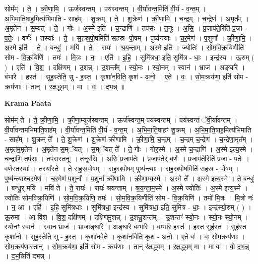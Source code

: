 \documentclass[17pt]{extarticle}
\begin{document}
सोम᳚म् । ते॒ । क्री॒णा॒मि॒ । ऊर्ज॑स्वन्तम् । पय॑स्वन्तम् । वी॒र्या॑वन्त॒मिति॑ वी॒र्य॑ - व॒न्त॒म् । अ॒भि॒मा॒ति॒षाह॒मित्य॑भिमाति - साह᳚म् । शु॒क्रम् । ते॒ । शु॒क्रेण॑ । क्री॒णा॒मि॒ । च॒न्द्रम् । च॒न्द्रेण॑ । अ॒मृत᳚म् । अ॒मृते॑न । स॒म्यत् । ते॒ । गोः । अ॒स्मे इति॑ । च॒न्द्राणि॑ । तप॑सः । त॒नूः । अ॒सि॒ । प्र॒जाप॑ते॒रिति॑ प्र॒जा - प॒तेः॒ । वर्णः॑ । तस्याः᳚ । ते॒ । स॒ह॒स्र॒पो॒षमिति॑ सहस्र -पो॒षम् । पुष्य॑न्त्याः । च॒र॒मेण॑ । प॒शुना᳚ । क्री॒णा॒मि॒ । अ॒स्मे इति॑ । ते॒ । बन्धुः॑ । मयि॑ । ते॒ । रायः॑ । श्र॒य॒न्ता॒म् । अ॒स्मे इति॑ । ज्योतिः॑ । सो॒म॒वि॒क्र॒यिणीति॑ सोम - वि॒क्र॒यिणि॑ । तमः॑ । मि॒त्रः । नः॒ । एति॑ । इ॒हि॒ । सुमि॑त्रधा॒ इति॒ सुमि॑त्र - धाः॒ । इन्द्र॑स्य । ऊ॒रुम् ( ) । एति॑ । वि॒श॒ । दक्षि॑णम् । उ॒शन्न् । उ॒शन्त᳚म् । स्यो॒नः । स्यो॒नम् । स्वान॑ । भ्राज॑ । अङ्घा॑रे । बंभा॑रे । हस्त॑ । सुह॒स्तेति॒ सु - ह॒स्त॒ । कृशा॑न॒विति॒ कृश॑ - अ॒नो॒ । ए॒ते । वः॒ । सो॒म॒क्रय॑णा॒ इति॑ सोम - क्रय॑णाः । तान् । र॒क्ष॒द्ध्व॒म् । मा । वः॒ । द॒भ॒न्न् ॥  \newline


\textbf{Krama Paata} \newline

सोम॑म् ते । ते॒ क्री॒णा॒मि॒ । क्री॒णा॒म्यूर्ज॑स्वन्तम् । ऊर्ज॑स्वन्त॒म् पय॑स्वन्तम् । पय॑स्वन्तं ॅवी॒र्या॑वन्तम् । वी॒र्या॑वन्तमभिमाति॒षाह᳚म् । वी॒र्या॑वन्त॒मिति॑ वी॒र्य॑ - व॒न्त॒म् । अ॒भि॒मा॒ति॒षाहꣳ॑ शु॒क्रम् । अ॒भि॒मा॒ति॒षाह॒मित्य॑भिमाति - साह᳚म् । शु॒क्रम् ते᳚ । ते॒ शु॒क्रेण॑ । शु॒क्रेण॑ क्रीणामि । क्री॒णा॒मि॒ च॒न्द्रम् । च॒न्द्रम् च॒न्द्रेण॑ । च॒न्द्रेणा॒मृत᳚म् । अ॒मृत॑म॒मृते॑न । अ॒मृते॑न स॒म्ॅयत् । स॒म्ॅयत् ते᳚ । ते॒ गोः । गोर॒स्मे । अ॒स्मे च॒न्द्राणि॑ । अ॒स्मे इत्य॒स्मे । च॒न्द्राणि॒ तप॑सः । तप॑सस्त॒नूः । त॒नूर॑सि । अ॒सि॒ प्र॒जाप॑तेः । प्र॒जाप॑ते॒र् वर्णः॑ । प्र॒जाप॑ते॒रिति॑ प्र॒जा - प॒तेः॒ । वर्ण॒स्तस्याः᳚ । तस्या᳚स्ते । ते॒ स॒ह॒स्र॒पो॒षम् । स॒ह॒स्र॒पो॒षम् पुष्य॑न्त्याः । स॒ह॒स्र॒पो॒षमिति॑ सहस्र - पो॒षम् । पुष्य॑न्त्याश्चर॒मेण॑ । च॒र॒मेण॑ प॒शुना᳚ । प॒शुना᳚ क्रीणामि । क्री॒णा॒म्य॒स्मे । अ॒स्मे ते᳚ । अ॒स्मे इत्य॒स्मे । ते॒ बन्धुः॑ । बन्धु॒र् मयि॑ । मयि॑ ते । ते॒ रायः॑ । रायः॑ श्रयन्ताम् । श्र॒य॒न्ता॒म॒स्मे । अ॒स्मे ज्योतिः॑ । अ॒स्मे इत्य॒स्मे । ज्योतिः॑ सोमविक्र॒यिणि॑ । सो॒म॒वि॒क्र॒यिणि॒ तमः॑ । सो॒म॒वि॒क्र॒यिणीति॑ सोम - वि॒क्र॒यिणि॑ । तमो॑ मि॒त्रः । मि॒त्रो नः॑ । न॒ आ । एहि॑ । इ॒हि॒ सुमि॑त्रधाः । सुमि॑त्रधा॒ इन्द्र॑स्य । सुमि॑त्रधा॒ इति॒ सुमि॑त्र - धाः॒ । इन्द्र॑स्यो॒रुम् ( ) । ऊ॒रुमा । आ वि॑श । वि॒श॒ दक्षि॑णम् । दक्षि॑णमु॒शन्न् । उ॒शन्नु॒शन्त᳚म् । उ॒शन्तꣳ॑ स्यो॒नः । स्यो॒नः स्यो॒नम् । स्यो॒नꣳ स्वान॑ । स्वान॒ भ्राज॑ । भ्राजाङ्घा॑रे । अङ्घा॑रे॒ बम्भा॑रे । बम्भा॑रे॒ हस्त॑ । हस्त॒ सुह॑स्त । सुह॑स्त॒ कृशा॑नो । सुह॒स्तेति॒ सु - ह॒स्त॒ । कृशा॑नवे॒ते । कृशा॑न॒विति॒ कृश॑ - अ॒नो॒ । ए॒ते वः॑ । वः॒ सो॒म॒क्रय॑णाः । सो॒म॒क्रय॑णा॒स्तान् । सो॒म॒क्रय॑णा॒ इति॑ सोम - क्रय॑णाः । तान् र॑क्षद्ध्वम् । र॒क्ष॒द्ध्व॒म् मा । मा वः॑ । वो॒ द॒भ॒न्न्॒ । द॒भ॒न्निति॑ दभन्न् । \newline
\end{document}
